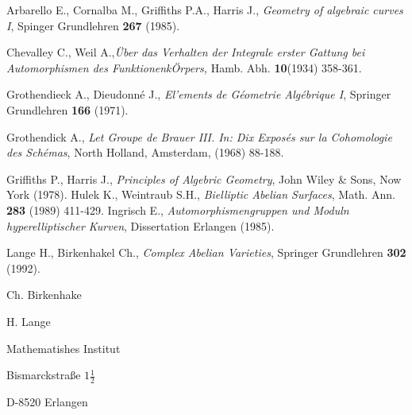 \begin{thebibliography}{99}
 Arbarello E., Cornalba M., Griffiths P.A., Harris J., \textit{Geometry of algebraic curves I}, Spinger Grundlehren {\bf 267} (1985).

 Chevalley C., Weil A.,\textit{\"Uber das Verhalten der Integrale erster Gattung bei Automorphismen des Funktionenk\"Orpers,} Hamb. Abh. {\bf 10}(1934) 358-361.

 Grothendieck A., Dieudonn\'e J., \textit{El'ements de G\'eometrie Alg\'ebrique I}, Springer Grundlehren {\bf 166} (1971).

 Grothendick A., \textit{Let Groupe de Brauer III. In: Dix Expos\'es sur la Cohomologie des Sch\'emas}, North Holland, Amsterdam, (1968) 88-188.

 Griffiths P., Harris J., \textit{Principles of Algebric Geometry}, John Wiley \& Sons, Now York (1978).
 Hulek K., Weintraub S.H., \textit{Bielliptic Abelian Surfaces}, Math. Ann. {\bf 283} (1989) 411-429.
 Ingrisch E., \textit{Automorphismengruppen und Moduln hyperelliptischer Kurven}, Dissertation Erlangen (1985).

 Lange H., Birkenhakel Ch., \textit{Complex Abelian Varieties}, Springer Grundlehren {\bf 302} (1992).
\end{thebibliography}

\begin{flushleft}
Ch. Birkenhake

H. Lange

Mathematishes Institut

Bismarckstra\ss e $1\frac{1}{2}$

D-8520 Erlangen 

\end{flushleft}
